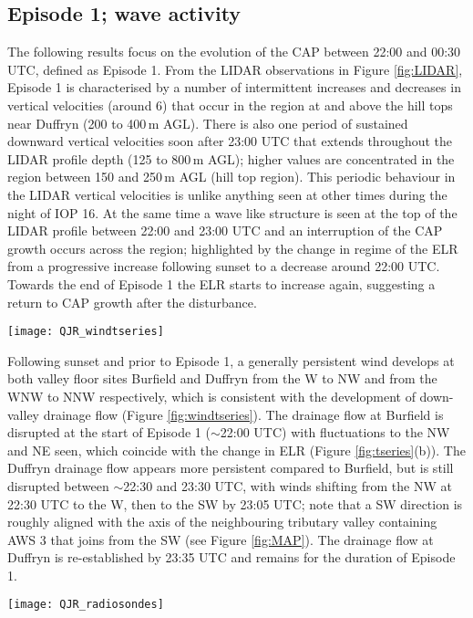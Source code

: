 \documentclass[times]{qjrms4}
\begin{document}
\subsection{Episode 1; wave activity}
\label{ep1}
The following results focus on the evolution of the CAP between 22:00 and 00:30 UTC, defined as Episode 1. From the LIDAR observations in Figure \ref{fig:LIDAR}, Episode 1 is characterised by a number of intermittent increases and decreases in vertical velocities (around 6) that occur in the region at and above the hill tops near Duffryn (200 to 400$\,\mbox{m}$ AGL). There is also one period of sustained downward vertical velocities soon after 23:00 UTC that extends throughout the LIDAR profile depth (125 to 800$\,\mbox{m}$ AGL); higher values are concentrated in the region between 150 and 250$\,\mbox{m}$ AGL (hill top region). This periodic behaviour in the LIDAR vertical velocities is unlike anything seen at other times during the night of IOP 16. At the same time a wave like structure is seen at the top of the LIDAR profile between 22:00 and 23:00 UTC and an interruption of the CAP growth occurs across the region; highlighted by the change in regime of the ELR from a progressive increase following sunset to a decrease around 22:00 UTC. Towards the end of Episode 1 the ELR starts to increase again, suggesting a return to CAP growth after the disturbance.
%
       \begin{figure*}
        \centering
        \texttt{[image: QJR\_windtseries]}
        \caption{Time-series of (a) Wind speed, and (b) wind direction, measured at the tower sites Burfield 30$\,\mbox{m}$ (346$\,\mbox{m}$ ASL), Duffryn 50$\,\mbox{m}$ (296$\,\mbox{m}$ ASL) and Springhill 30$\,\mbox{m}$ (432$\,\mbox{m}$ ASL).}
        \label{fig:windtseries}
        \end{figure*}
        
Following sunset and prior to Episode 1, a generally persistent wind develops at both valley floor sites Burfield and Duffryn from the W to NW and from the WNW to NNW respectively, which is consistent with the development of down-valley drainage flow (Figure \ref{fig:windtseries}). The drainage flow at Burfield is disrupted at the start of Episode 1 ($\sim$22:00 UTC) with fluctuations to the NW and NE seen, which coincide with the change in ELR (Figure \ref{fig:tseries}(b)). The Duffryn drainage flow appears more persistent compared to Burfield, but is still disrupted between $\sim$22:30 and 23:30 UTC, with winds shifting from the NW at 22:30 UTC to the W, then to the SW by 23:05 UTC; note that a SW direction is roughly aligned with the axis of the neighbouring tributary valley containing AWS 3 that joins from the SW (see Figure \ref{fig:MAP}). The drainage flow at Duffryn is re-established by 23:35 UTC and remains for the duration of Episode 1.
%
       \begin{figure*}
        \centering
        \texttt{[image: QJR\_radiosondes]}
        \caption{Radiosonde profiles launched from Duffryn at 16:00, 22:02, 23:01, 00:30 and 05:35 UTC, showing; (a) $\theta$, (b) RH (\%), (c) wind speed (m s$^-1$), (d) wind direction.}
        \label{fig:radiosondes}
        \end{figure*}
\end{document}
